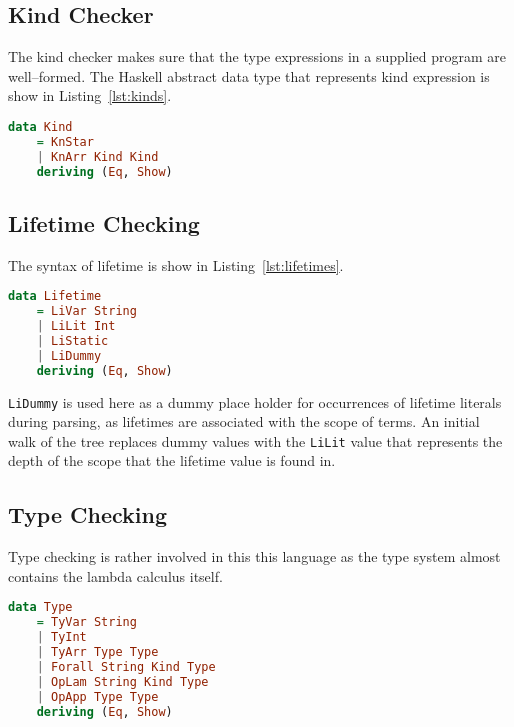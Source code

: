 \subsection{Kind Checker}
The kind checker makes sure that the type expressions in a supplied program are
well--formed. The Haskell abstract data type that represents kind expression is
show in Listing~\ref{lst:kinds}.

\begin{lstlisting}[caption=Haskell representation of Kinds., language=Haskell, label={lst:kinds}]
data Kind
    = KnStar
    | KnArr Kind Kind
    deriving (Eq, Show)
\end{lstlisting}

\subsection{Lifetime Checking}
The syntax of lifetime is show in Listing~\ref{lst:lifetimes}. 

\begin{lstlisting}[caption=Haskell representation of Lifetimes.., language=Haskell, label={lst:lifetimes}]
data Lifetime 
    = LiVar String
    | LiLit Int
    | LiStatic
    | LiDummy
    deriving (Eq, Show)
\end{lstlisting}

\lstinline{LiDummy} is used here as a dummy place holder for occurrences of
lifetime literals during parsing, as lifetimes are associated with the scope of
terms. An initial walk of the tree replaces dummy values with the
\lstinline{LiLit} value that represents the depth of the scope that the
lifetime value is found in.


\subsection{Type Checking}
Type checking is rather involved in this this language as the type system
almost contains the lambda calculus itself.

\begin{lstlisting}[caption=Haskell representation of Types., language=Haskell, label={lst:types}]
data Type
    = TyVar String
    | TyInt
    | TyArr Type Type
    | Forall String Kind Type
    | OpLam String Kind Type
    | OpApp Type Type
    deriving (Eq, Show)
\end{lstlisting}

